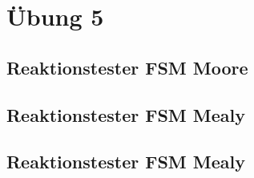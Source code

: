 \section{Übung 5}
\subsection{Reaktionstester FSM  Moore}

\subsection{Reaktionstester FSM  Mealy}

\subsection{Reaktionstester FSM  Mealy}
